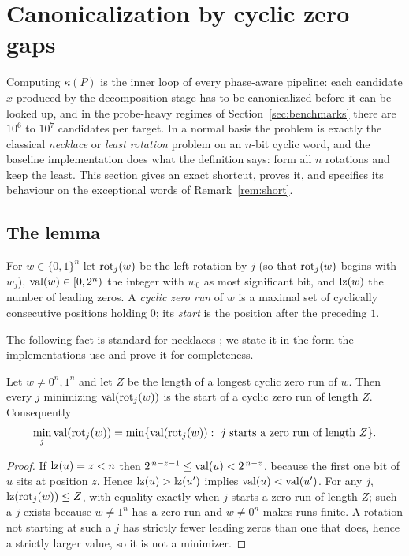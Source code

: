 \section{Canonicalization by cyclic zero gaps}
\label{sec:canonicalization}

Computing $\kappa(P)$ is the inner loop of every phase-aware pipeline:
each candidate $x$ produced by the decomposition stage has to be
canonicalized before it can be looked up, and in the probe-heavy
regimes of Section~\ref{sec:benchmarks} there are $10^6$ to $10^7$
candidates per target. In a normal basis the problem is exactly the
classical \emph{necklace} or \emph{least rotation} problem on an
$n$-bit cyclic word, and the baseline implementation does what the
definition says: form all $n$ rotations and keep the least. This
section gives an exact shortcut, proves it, and specifies its behaviour
on the exceptional words of Remark~\ref{rem:short}.

\subsection{The lemma}

For $w\in\{0,1\}^n$ let $\operatorname{rot}_j(w)$ be the left rotation by $j$ (so
that $\operatorname{rot}_j(w)$ begins with $w_j$), $\operatorname{val}(w)\in[0,2^n)$ the integer
with $w_0$ as most significant bit, and $\operatorname{lz}(w)$ the number of
leading zeros. A \emph{cyclic zero run} of $w$ is a maximal set of
cyclically consecutive positions holding $0$; its \emph{start} is the
position after the preceding $1$.

The following fact is standard for necklaces
\citep{ruskeysawada1999,gabricsawada2026}; we state it in the form the
implementations use and prove it for completeness.

\begin{lemma}
\label{lem:zerogap}
Let $w\ne0^n,1^n$ and let $Z$ be the length of a longest cyclic zero
run of $w$. Then every $j$ minimizing $\operatorname{val}(\operatorname{rot}_j(w))$ is the start of
a cyclic zero run of length $Z$. Consequently
\[
  \min_j\val(\rot_j(w))=\min\{\val(\rot_j(w)):\ j\text{ starts a zero run of length }Z\}.
\]
\end{lemma}
\begin{proof}
If $\operatorname{lz}(u)=z<n$ then $2^{\,n-z-1}\le\operatorname{val}(u)<2^{\,n-z}$, because the
first one bit of $u$ sits at position $z$. Hence $\operatorname{lz}(u)>\operatorname{lz}(u')$
implies $\operatorname{val}(u)<\operatorname{val}(u')$. For any $j$, $\operatorname{lz}(\operatorname{rot}_j(w))\le Z$, with
equality exactly when $j$ starts a zero run of length $Z$; such a $j$
exists because $w\ne1^n$ has a zero run and $w\ne0^n$ makes runs finite.
A rotation not starting at such a $j$ has strictly fewer leading
zeros than one that does, hence a strictly larger value, so it is not
a minimizer.
\end{proof}

